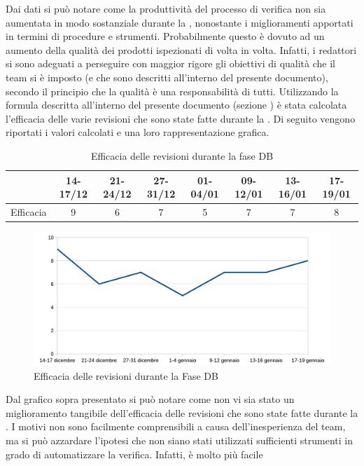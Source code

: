 				Dai dati si può notare come la produttività del processo di verifica non sia aumentata in modo sostanziale durante la , nonostante 
				i miglioramenti apportati in termini di procedure e strumenti. Probabilmente questo è dovuto ad un aumento della qualità dei prodotti 
				ispezionati di volta in volta. Infatti, i redattori si sono adeguati a perseguire con maggior rigore gli obiettivi di qualità che il team 
				si è imposto (e che sono descritti all'interno del presente documento), secondo il principio che la qualità è una responsabilità di tutti.
				Utilizzando la formula descritta all'interno del presente documento (sezione ) è stata calcolata l'efficacia delle 
				varie revisioni che sono state fatte durante la . Di seguito vengono riportati i valori calcolati e una loro rappresentazione grafica.
				\begin{table}[H]
					\centering
					\begin{tabu}{| l | c | c | c | c | c | c | c |}
						\hline
							&14-17/12	&21-24/12	&27-31/12 	&01-04/01	&09-12/01	&13-16/01	&17-19/01	\\ \hline
						Efficacia	&9	&6	&7	&5	&7	&7	&8 \\ \hline
					\end{tabu}
					\caption{Efficacia delle revisioni durante la fase DB}
				\end{table}
				\begin{figure}[H]
					\centering
					\includegraphics[width=12cm]{PianoDiQualifica/Pics/EfficaciaRevisioniFaseDB.pdf}
					\caption{Efficacia delle revisioni durante la Fase DB}
				\end{figure}
				Dal grafico sopra presentato si può notare come non vi sia stato un miglioramento tangibile dell'efficacia delle revisioni che sono 
				state fatte durante la . I motivi non sono facilmente comprensibili a causa dell'inesperienza del team, ma si può azzardare 
				l'ipotesi che non siano stati utilizzati sufficienti strumenti in grado di automatizzare la verifica. Infatti, è molto più facile 
